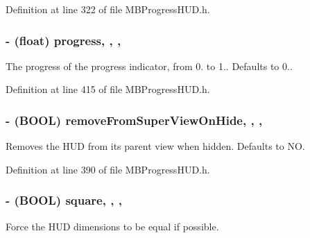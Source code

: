 Definition at line 322 of file M\+B\+Progress\+H\+U\+D.\+h.

\hypertarget{interface_m_b_progress_h_u_d_a4c8328617d11efd1f5452032246ca97f}{
\subsubsection[{progress}]{\setlength{\rightskip}{0pt plus 5cm}-\/ (float) progress\hspace{0.3cm}{\ttfamily [read]}, {\ttfamily [write]}, {\ttfamily [atomic]}, {\ttfamily [assign]}}}\label{interface_m_b_progress_h_u_d_a4c8328617d11efd1f5452032246ca97f}
The progress of the progress indicator, from 0. to 1.. Defaults to 0.. 

Definition at line 415 of file M\+B\+Progress\+H\+U\+D.\+h.

\hypertarget{interface_m_b_progress_h_u_d_a36639aa18a70f2734942695c32ec5e91}{
\subsubsection[{remove\+From\+Super\+View\+On\+Hide}]{\setlength{\rightskip}{0pt plus 5cm}-\/ (B\+O\+O\+L) remove\+From\+Super\+View\+On\+Hide\hspace{0.3cm}{\ttfamily [read]}, {\ttfamily [write]}, {\ttfamily [atomic]}, {\ttfamily [assign]}}}\label{interface_m_b_progress_h_u_d_a36639aa18a70f2734942695c32ec5e91}
Removes the H\+U\+D from its parent view when hidden. Defaults to N\+O. 

Definition at line 390 of file M\+B\+Progress\+H\+U\+D.\+h.

\hypertarget{interface_m_b_progress_h_u_d_a4bf7271b213e304259aa7d97f7cb1849}{
\subsubsection[{square}]{\setlength{\rightskip}{0pt plus 5cm}-\/ (B\+O\+O\+L) square\hspace{0.3cm}{\ttfamily [read]}, {\ttfamily [write]}, {\ttfamily [atomic]}, {\ttfamily [assign]}}}\label{interface_m_b_progress_h_u_d_a4bf7271b213e304259aa7d97f7cb1849}
Force the H\+U\+D dimensions to be equal if possible. 

